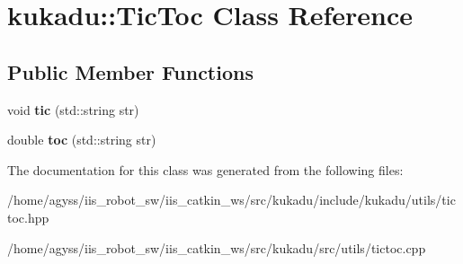 \hypertarget{classkukadu_1_1TicToc}{}\section{kukadu\+:\+:Tic\+Toc Class Reference}
\label{classkukadu_1_1TicToc}
\subsection*{Public Member Functions}
\begin{DoxyCompactItemize}
\item 
void {\bfseries tic} (std\+::string str)\hypertarget{classkukadu_1_1TicToc_a1033778451e91338c746153450122817}{}\label{classkukadu_1_1TicToc_a1033778451e91338c746153450122817}

\item 
double {\bfseries toc} (std\+::string str)\hypertarget{classkukadu_1_1TicToc_ae37627430c6e0e72057cfd6924c3b9f2}{}\label{classkukadu_1_1TicToc_ae37627430c6e0e72057cfd6924c3b9f2}

\end{DoxyCompactItemize}


The documentation for this class was generated from the following files\+:\begin{DoxyCompactItemize}
\item 
/home/agyss/iis\+\_\+robot\+\_\+sw/iis\+\_\+catkin\+\_\+ws/src/kukadu/include/kukadu/utils/tictoc.\+hpp\item 
/home/agyss/iis\+\_\+robot\+\_\+sw/iis\+\_\+catkin\+\_\+ws/src/kukadu/src/utils/tictoc.\+cpp\end{DoxyCompactItemize}
